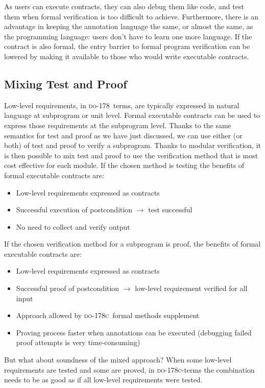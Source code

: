 \documentclass[sttt,final]{svjour}
\newcommand{\DO}{\textsc{do-178}}
\newcommand{\DOC}{\textsc{do-178c}}
\begin{document}
As users can execute contracts, they can also debug them like code, and test
them when formal verification is too difficult to achieve.
Furthermore, there is an advantage in keeping the annotation language
the same, or almost the same, as the programming language: users
don't have to learn one more language. If the contract is also formal,
the entry barrier to formal program verification can be lowered by
making it available to those who would write executable contracts.

\subsection{Mixing Test and Proof}

Low-level requirements, in \DO\ terms, are typically expressed in
natural language at subprogram or unit level. Formal executable
contracts can be used to express those requirements at the
subprogram level. Thanks to the same semantics for test and proof as
we have just discussed, we can use either (or both) of test and proof
to verify a subprogram. Thanks to modular verification, it is then
possible to mix test and proof to use the verification method that is
most cost effective for each module. If the chosen method is testing
the benefits of formal executable contracts are:
%
\begin{itemize}
\item Low-level requirements expressed as contracts
\item Successful execution of postcondition $\rightarrow$ test successful
\item No need to collect and verify output
\end{itemize}
If the chosen verification method for a subprogram is proof, the
benefits of formal executable contracts are:
\begin{itemize}
\item Low-level requirements expressed as contracts
\item Successful proof of postcondition $\rightarrow$ low-level
  requirement verified for all input
\item Approach allowed by \DOC\ formal methods supplement
\item Proving process faster when annotations can be executed (debugging failed proof attempts is very time-consuming)
\end{itemize}
%
But what about soundness of the mixed approach? When some low-level
requirements are tested and some are proved, in
\DOC-terms the combination needs to be as good as if all low-level
requirements were tested.
\end{document}
